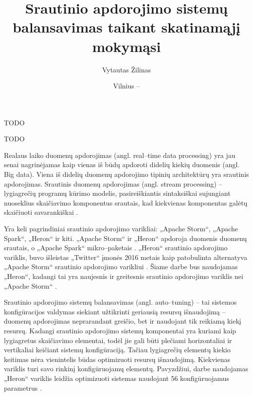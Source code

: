 \documentclass{VUMIFPSbakalaurinis}
\title{Srautinio apdorojimo sistemų balansavimas taikant skatinamąjį mokymąsi}
\author{Vytautas Žilinas}
\date{Vilnius – \the\year}
\begin{document}
 
\maketitle

\cleardoublepage{}
\setcounter{page}{2}

TODO

TODO

\tableofcontents


Realaus laiko duomenų apdorojimas (angl. real–time data processing) yra jau senai nagrinėjamas kaip vienas iš būdų apdoroti didelių kiekių duomenis (angl. Big data). Viena iš didelių duomenų apdorojimo tipinių architektūrų yra srautinis apdorojimas. Srautinis duomenų apdorojimas (angl. stream processing) – lygiagrečių programų kūrimo modelis, pasireiškiantis sintaksiškai sujungiant nuoseklius skaičiavimo komponentus srautais, kad kiekvienas komponentas galėtų skaičiuoti savarankiškai \cite{shortstreamproc}. 

Yra keli pagrindiniai srautinio apdorojimo varikliai: „Apache Storm“, „Apache Spark“, „Heron“ ir kiti. „Apache Storm“ ir „Heron“ apdoroja duomenis duomenų srautais, o „Apache Spark“ mikro–paketais \cite{karau2015learning}. „Heron“ srautinio apdorojimo variklis, buvo išleistas „Twitter“ įmonės 2016 metais kaip patobulinta alternatyva „Apache Storm“ srautinio apdorojimo varikliui \cite{openSourcing}. Šiame darbe bus naudojamas „Heron“, kadangi tai yra naujesnis ir greitesnis srautinio apdorojimo variklis nei „Apache Storm“ \cite{twitterHeron}. 

Srautinio apdorojimo sistemų balansavimas (angl. auto–tuning) – tai sistemos konfigūracijos valdymas siekiant užtikrinti geriausią resursų išnaudojimą – duomenų apdorojimas neprarandant greičio, bet ir naudojant tik reikiamą kiekį resursų. Kadangi srautinio apdorojimo sistemų komponentai yra kuriami kaip lygiagretus skaičiavimo elementai, todėl jie gali būti plečiami horizontaliai ir vertikaliai \cite{shortstreamproc} keičiant sistemų konfigūraciją. Tačiau lygiagrečių elementų kiekio keitimas nėra vienintelis būdas optimizuoti resursų išnaudojimą. Kiekvienas variklis turi savo rinkinį konfigūruojamų elementų. Pavyzdžiui, darbe naudojamas „Heron“ variklis leidžia optimizuoti sistemas naudojant 56 konfigūruojamus parametrus \cite{configDocument}.
\end{document}
